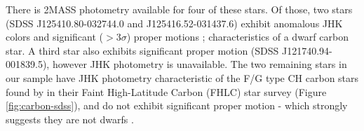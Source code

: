 

	There is 2MASS photometry available for four of these stars. Of those, two stars (SDSS J125410.80-032744.0 and J125416.52-031437.6) exhibit anomalous JHK colors and significant ($> 3\sigma$) proper motions \citep[PPMXL][]{Roser;et-al_2010}; characteristics of a dwarf carbon star. A third star also exhibits significant proper motion (SDSS J121740.94-001839.5), however JHK photometry is unavailable. The two remaining stars in our sample have JHK photometry characteristic of the F/G type CH carbon stars found by \citet{Downes;et-al_2004} in their Faint High-Latitude Carbon (FHLC) star survey (Figure \ref{fig:carbon-sdss}), and do not exhibit significant proper motion - which strongly suggests they are not dwarfs \citep{Green;et-al_1994, Deutsch_1994}.

